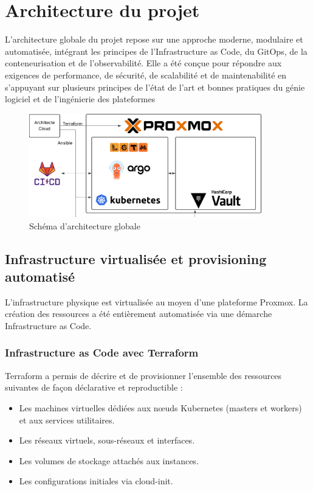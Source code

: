 
\section{Architecture du projet}

L'architecture globale du projet repose sur une approche moderne, modulaire et automatisée, intégrant les principes de l'Infrastructure as Code, du GitOps, de la conteneurisation et de l'observabilité. Elle a été conçue pour répondre aux exigences de performance, de sécurité, de scalabilité et de maintenabilité en s'appuyant sur plusieurs principes de l’état de l’art et bonnes pratiques du génie logiciel et de l’ingénierie des plateformes
\begin{figure}[H]
	\centering
	\includegraphics[width=0.9\textwidth]{figures/architecture-globale.png}
	\caption{Schéma d'architecture globale}
\end{figure}

\subsection{Infrastructure virtualisée et provisioning automatisé}

L'infrastructure physique est virtualisée au moyen d'une plateforme Proxmox. La création des ressources a été entièrement automatisée via une démarche Infrastructure as Code.

\subsubsection*{Infrastructure as Code avec Terraform}

Terraform a permis de décrire et de provisionner l'ensemble des ressources suivantes de façon déclarative et reproductible :
\begin{itemize}
	\item Les machines virtuelles dédiées aux nœuds Kubernetes (masters et workers) et aux services utilitaires.
	\item Les réseaux virtuels, sous-réseaux et interfaces.
	\item Les volumes de stockage attachés aux instances.
	\item Les configurations initiales via cloud-init.
\end{itemize}

